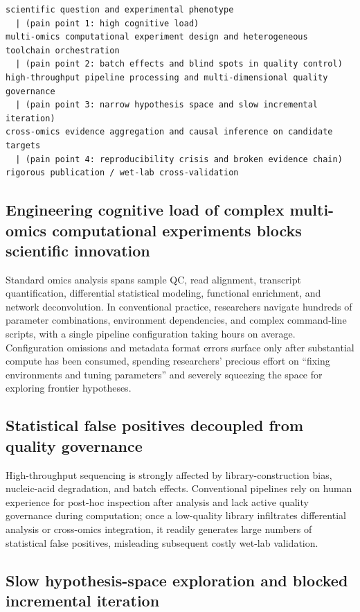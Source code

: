 \documentclass[11pt,a4paper]{article}
\begin{document}
\begin{verbatim}
scientific question and experimental phenotype
  | (pain point 1: high cognitive load)
multi-omics computational experiment design and heterogeneous toolchain orchestration
  | (pain point 2: batch effects and blind spots in quality control)
high-throughput pipeline processing and multi-dimensional quality governance
  | (pain point 3: narrow hypothesis space and slow incremental iteration)
cross-omics evidence aggregation and causal inference on candidate targets
  | (pain point 4: reproducibility crisis and broken evidence chain)
rigorous publication / wet-lab cross-validation
\end{verbatim}

\subsection{Engineering cognitive load of complex multi-omics computational experiments blocks scientific innovation}

Standard omics analysis spans sample QC, read alignment, transcript quantification, differential statistical modeling, functional enrichment, and network deconvolution. In conventional practice, researchers navigate hundreds of parameter combinations, environment dependencies, and complex command-line scripts, with a single pipeline configuration taking hours on average. Configuration omissions and metadata format errors surface only after substantial compute has been consumed, spending researchers' precious effort on ``fixing environments and tuning parameters'' and severely squeezing the space for exploring frontier hypotheses.

\subsection{Statistical false positives decoupled from quality governance}

High-throughput sequencing is strongly affected by library-construction bias, nucleic-acid degradation, and batch effects. Conventional pipelines rely on human experience for post-hoc inspection after analysis and lack active quality governance during computation; once a low-quality library infiltrates differential analysis or cross-omics integration, it readily generates large numbers of statistical false positives, misleading subsequent costly wet-lab validation.

\subsection{Slow hypothesis-space exploration and blocked incremental iteration}
\end{document}
